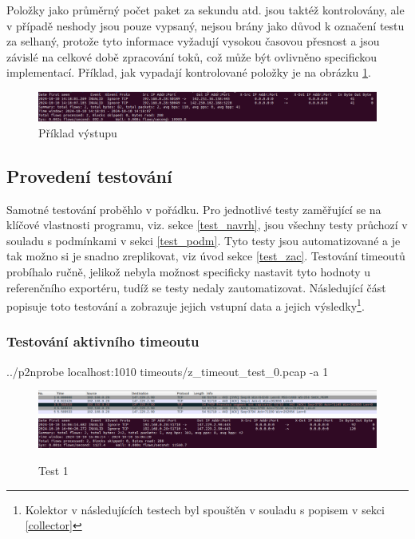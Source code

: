 \documentclass[11pt, a4paper, hidelinks]{article}[08.10.2023]
\begin{document}
    Položky jako průměrný počet paket za sekundu atd. jsou taktéž kontrolovány, ale v případě neshody jsou pouze vypsaný, nejsou brány jako důvod k označení testu za selhaný, protože tyto informace vyžadují vysokou časovou přesnost a jsou závislé na celkové době zpracování toků, což může být ovlivněno specifickou implementací. Příklad, jak vypadají kontrolované položky je na obrázku \ref{test_pr}.

    \begin{figure}[ht]
        \centering
        \includegraphics[width=1\linewidth]{pictures/test_pr.png}
        \caption{Příklad výstupu}
        \label{test_pr}
    \end{figure}
    
    \subsection{Provedení testování}
    Samotné testování proběhlo v pořádku. Pro jednotlivé testy zaměřující se na klíčové vlastnosti programu, viz. sekce  \ref{test_navrh}, jsou všechny testy průchozí v souladu s podmínkami v sekci \ref{test_podm}. Tyto testy jsou automatizované a  je tak možno si je snadno zreplikovat, viz úvod sekce \ref{test_zac}. Testování timeoutů probíhalo ručně, jelikož nebyla možnost specificky nastavit tyto hodnoty u referenčního exportéru, tudíž se testy nedaly zautomatizovat. Následující část popisuje toto testování a zobrazuje jejich vstupní data a jejich výsledky\footnote{Kolektor v následujících testech byl spouštěn v souladu s popisem v sekci \ref{collector}}.
        \pagebreak
    \subsubsection{Testování aktivního timeoutu}

    \begin{center}
        ../p2nprobe localhost:1010 timeouts/z\_timeout\_test\_0.pcap -a 1
    \end{center}
    \vspace{1cm}
    \begin{figure}[ht]
        \centering
        \includegraphics[width=1\linewidth]{pictures/test_1_data.png}
        \includegraphics[width=1\linewidth]{pictures/test_1_res.png}
        \caption{Test 1}
    \end{figure}
\end{document}
